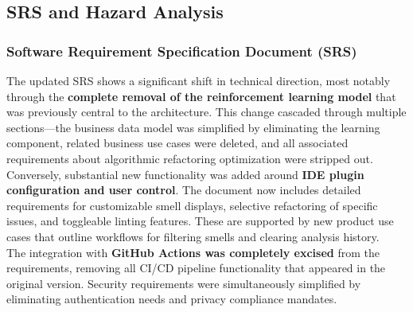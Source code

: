 \documentclass{article}
\begin{document}


\subsection{SRS and Hazard Analysis}

\subsubsection{Software Requirement Specification Document (SRS)}

The updated SRS shows a significant shift in technical direction, most notably through the \textbf{complete removal of the reinforcement learning model} that was previously central to the architecture. This change cascaded through multiple sections—the business data model was simplified by eliminating the learning component, related business use cases were deleted, and all associated requirements about algorithmic refactoring optimization were stripped out.\\

Conversely, substantial new functionality was added around \textbf{IDE plugin configuration and user control}. The document now includes detailed requirements for customizable smell displays, selective refactoring of specific issues, and toggleable linting features. These are supported by new product use cases that outline workflows for filtering smells and clearing analysis history.\\

The integration with \textbf{GitHub Actions was completely excised} from the requirements, removing all CI/CD pipeline functionality that appeared in the original version. Security requirements were simultaneously simplified by eliminating authentication needs and privacy compliance mandates.\\
\end{document}
